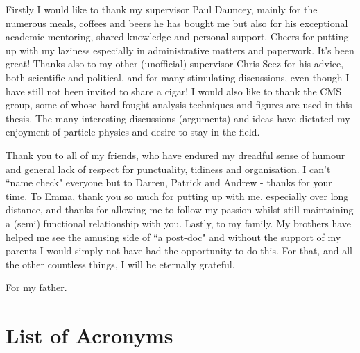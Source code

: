 \begin{acknowledgements}
  Firstly I would like to thank my supervisor Paul Dauncey, mainly for the numerous meals, coffees and beers he has bought me but also for his exceptional academic mentoring, shared knowledge and personal support. Cheers for putting up with my laziness especially in administrative matters and paperwork. It's been great! Thanks also to my other (unofficial) supervisor Chris Seez for his advice, both scientific and political, and for many stimulating discussions, even though I have still not been invited to share a cigar! I would also like to thank the CMS \Hgg group, some of whose hard fought analysis techniques and figures are used in this thesis. The many interesting discussions (arguments) and ideas have dictated my enjoyment of particle physics and desire to stay in the field.

  Thank you to all of my friends, who have endured my dreadful sense of humour and general lack of respect for punctuality, tidiness and organisation. I can't ``name check" everyone but to Darren, Patrick and Andrew - thanks for your time. To Emma, thank you so much for putting up with me, especially over long distance, and thanks for allowing me to follow my passion whilst still maintaining a (semi) functional relationship with you. Lastly, to my family. My brothers have helped me see the amusing side of ``a post-doc" and without the support of my parents I would simply not have had the opportunity to do this. For that, and all the other countless things, I will be eternally grateful. 

\end{acknowledgements}



\frontquote%
  {For my father.}%
  {}

\tableofcontents
\listoffigures
\listoftables
\newpage
{}
\chapter*{List of Acronyms}


\newpage
\thispagestyle{empty}
\mbox{}
